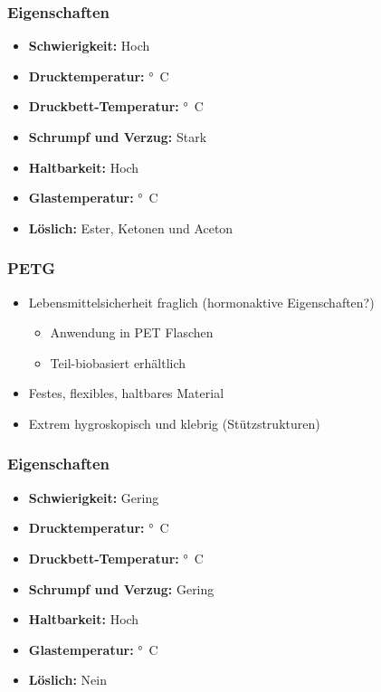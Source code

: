 {\begin{frame}
  \frametitle{Eigenschaften}
  \pause
  \begin{itemize}
    \item \textbf{Schwierigkeit:} Hoch
    \item \textbf{Drucktemperatur:} \unit[210-250]{°C}
    \item \textbf{Druckbett-Temperatur:} \unit[80 - 110]{°C}
    \item \textbf{Schrumpf und Verzug:} Stark
    \item \textbf{Haltbarkeit:} Hoch
    \item \textbf{Glastemperatur:} \unit[95 - 110]{°C}
    \item \textbf{Löslich:} Ester, Ketonen und Aceton
  \end{itemize}
\end{frame}

\begin{frame}
  \frametitle{PETG}
  \pause
  \begin{itemize}
    \item Lebensmittelsicherheit fraglich (hormonaktive Eigenschaften?) \pause
    \begin{itemize}
      \item Anwendung in PET Flaschen
      \item Teil-biobasiert erhältlich \pause
    \end{itemize}
    \item Festes, flexibles, haltbares Material \pause
    \item Extrem hygroskopisch und klebrig (Stützstrukturen)
  \end{itemize}
\end{frame}

\begin{frame}
  \frametitle{Eigenschaften}
  \pause
  \begin{itemize}
    \item \textbf{Schwierigkeit:} Gering
    \item \textbf{Drucktemperatur:} \unit[220 - 250]{°C}
    \item \textbf{Druckbett-Temperatur:} \unit[50 - 75]{°C}
    \item \textbf{Schrumpf und Verzug:} Gering
    \item \textbf{Haltbarkeit:} Hoch
    \item \textbf{Glastemperatur:} \unit[70]{°C}
    \item \textbf{Löslich:} Nein
  \end{itemize}
\end{frame}

}
